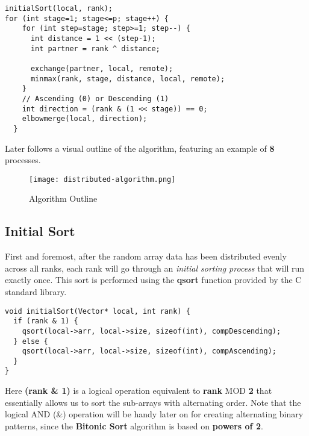 \documentclass[12pt]{report}
\begin{document}
\begin{lstlisting}[style=cstyle]
initialSort(local, rank); 
for (int stage=1; stage<=p; stage++) {
    for (int step=stage; step>=1; step--) {
      int distance = 1 << (step-1);
      int partner = rank ^ distance;

      exchange(partner, local, remote);
      minmax(rank, stage, distance, local, remote);
    }
    // Ascending (0) or Descending (1)
    int direction = (rank & (1 << stage)) == 0;     
    elbowmerge(local, direction);
  }
\end{lstlisting}

Later follows a visual outline of the algorithm, featuring an example of \textbf{8} processes.

\begin{figure}
    \centering
    \texttt{[image: distributed-algorithm.png]}
    \caption{Algorithm Outline}
    \label{fig:enter-label}
\end{figure}

\subsection{Initial Sort}

First and foremost, after the random array data has been distributed evenly across all ranks, each rank will go through an \textit{initial sorting process} that will run exactly once. This sort is performed using the \textbf{qsort} function provided by the C standard library.

\begin{lstlisting}[style=cstyle]
void initialSort(Vector* local, int rank) {
  if (rank & 1) {
    qsort(local->arr, local->size, sizeof(int), compDescending);
  } else { 
    qsort(local->arr, local->size, sizeof(int), compAscending);
  }
}
\end{lstlisting}

Here \textbf{(rank \& 1)} is a logical operation equivalent to \textbf{rank} MOD \textbf{2}  that essentially allows us to sort the sub-arrays with alternating order. 
Note that the logical AND (\&) operation will be handy later on for creating alternating binary patterns, since the \textbf{Bitonic Sort} algorithm is based on \textbf{powers of 2}.
\end{document}
